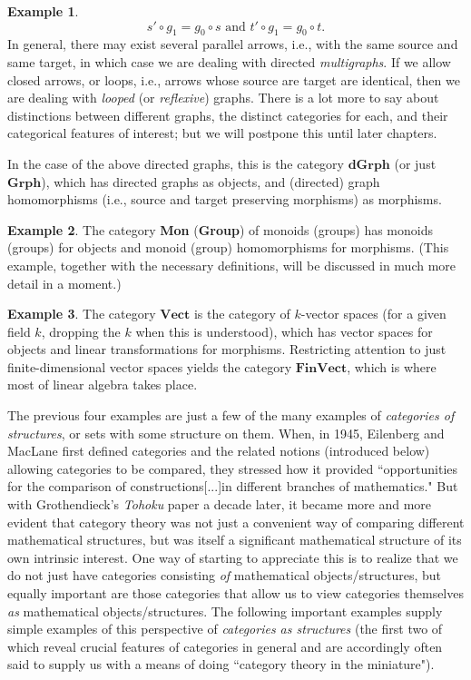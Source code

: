 \documentclass[11pt]{book}
\theoremstyle{definition}
\newtheorem{example}{Example}[section]
\theoremstyle{definition}
\theoremstyle{definition}
\theoremstyle{theorem}
\theoremstyle{definition}
\begin{document}
\begin{example}
\begin{equation*}
s' \circ g_1 = g_0 \circ s \text{ and } t' \circ g_1 = g_0 \circ t.
\end{equation*}
In general, there may exist several parallel arrows, i.e., with the same source and same target, in which case we are dealing with directed \textit{multigraphs}. If we allow closed arrows, or loops, i.e., arrows whose source are target are identical, then we are dealing with \textit{looped} (or \textit{reflexive}) graphs. There is a lot more to say about distinctions between different graphs, the distinct categories for each, and their categorical features of interest; but we will postpone this until later chapters. \par 
In the case of the above directed graphs, this is the category $\textbf{dGrph}$ (or just $\textbf{Grph}$), which has directed graphs as objects, and (directed) graph homomorphisms (i.e., source and target preserving morphisms) as morphisms.    
\end{example}
\begin{example}
	The category \textbf{Mon} (\textbf{Group}) of monoids (groups)   has monoids (groups) for objects and monoid (group) homomorphisms for morphisms. (This example, together with the necessary definitions, will be discussed in much more detail in a moment.)
\end{example}
\begin{example}
	The category $\textbf{Vect}$  is the category of $k$-vector spaces (for a given field $k$, dropping the $k$ when this is understood), which has vector spaces for objects and linear transformations for morphisms. Restricting attention to just finite-dimensional vector spaces yields the category $\textbf{FinVect}$, which is where most of linear algebra takes place.   
\end{example}
The previous four examples are just a few of the many examples of \textit{categories of structures}, or sets with some structure on them. When, in 1945, Eilenberg and MacLane first defined categories and the related notions (introduced below) allowing categories to be compared, they stressed how it provided ``opportunities for the comparison of constructions[...]in different branches of mathematics." But with Grothendieck's \textit{Tohoku} paper a decade later, it became more and more evident that category theory was not just a convenient way of comparing different mathematical structures, but was itself a significant mathematical structure of its own intrinsic interest. One way of starting to appreciate this is to realize that we do not just have categories consisting \textit{of} mathematical objects/structures, but equally important are those categories that allow us to view categories themselves \textit{as} mathematical objects/structures. The following important examples supply simple examples of this perspective of \textit{categories as structures} (the first two of which reveal crucial features of categories in general and are accordingly often said to supply us with a means of doing ``category theory in the miniature").  
\end{document}
